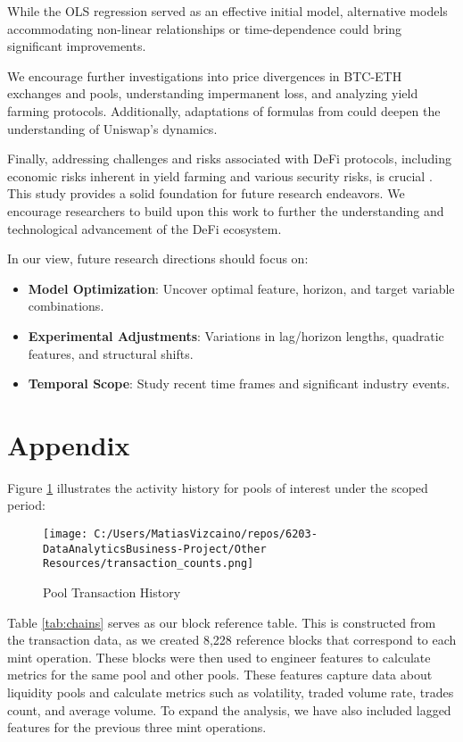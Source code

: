\documentclass{article}
\begin{document}
While the OLS regression served as an effective initial model, alternative models accommodating non-linear relationships or time-dependence could bring significant improvements.

We encourage further investigations into price divergences in BTC-ETH exchanges and pools, understanding impermanent loss, and analyzing yield farming protocols. Additionally, adaptations of formulas from \cite{Elsts2021} could deepen the understanding of Uniswap's dynamics.

Finally, addressing challenges and risks associated with DeFi protocols, including economic risks inherent in yield farming and various security risks, is crucial \cite{Xu2023}. This study provides a solid foundation for future research endeavors. We encourage researchers to build upon this work to further the understanding and technological advancement of the DeFi ecosystem.

In our view, future research directions should focus on:

\begin{itemize}
\item \textbf{Model Optimization}: Uncover optimal feature, horizon, and target variable combinations.
\item \textbf{Experimental Adjustments}: Variations in lag/horizon lengths, quadratic features, and structural shifts.
\item \textbf{Temporal Scope}: Study recent time frames and significant industry events.
\end{itemize}


\newpage
\section{Appendix}

Figure \ref{fig:pool-transactions} illustrates the activity history for pools of interest under the scoped period:

\begin{figure}[htbp]
  \centering
  \texttt{[image: C:/Users/MatiasVizcaino/repos/6203-DataAnalyticsBusiness-Project/Other Resources/transaction\_counts.png]}
  \caption{Pool Transaction History}
  \label{fig:pool-transactions}
\end{figure}

Table \ref{tab:chains} serves as our block reference table. This is constructed from the transaction data, as we created 8,228 reference blocks that correspond to each mint operation. These blocks were then used to engineer features to calculate metrics for the same pool and other pools. These features capture data about liquidity pools and calculate metrics such as volatility, traded volume rate, trades count, and average volume. To expand the analysis, we have also included lagged features for the previous three mint operations.
\end{document}
